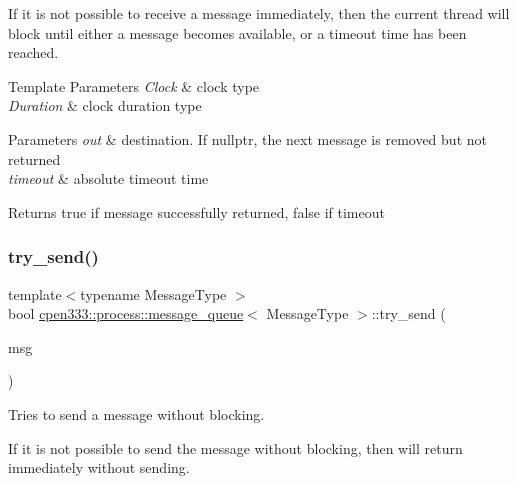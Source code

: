 If it is not possible to receive a message immediately, then the current thread will block until either a message becomes available, or a timeout time has been reached.


\begin{DoxyTemplParams}{Template Parameters}
{\em Clock} & clock type \\
\hline
{\em Duration} & clock duration type \\
\hline
\end{DoxyTemplParams}

\begin{DoxyParams}{Parameters}
{\em out} & destination. If {\ttfamily nullptr}, the next message is removed but not returned \\
\hline
{\em timeout} & absolute timeout time \\
\hline
\end{DoxyParams}
\begin{DoxyReturn}{Returns}
{\ttfamily true} if message successfully returned, {\ttfamily false} if timeout 
\end{DoxyReturn}
\mbox{\label{classcpen333_1_1process_1_1message__queue_ae632a2b200bdac5bc93039b9bcb3d7f5}} 
\subsubsection{\texorpdfstring{try\+\_\+send()}{try\_send()}}
{\footnotesize\ttfamily template$<$typename Message\+Type $>$ \\
bool \hyperlink{classcpen333_1_1process_1_1message__queue}{cpen333\+::process\+::message\+\_\+queue}$<$ Message\+Type $>$\+::try\+\_\+send (\begin{DoxyParamCaption}\item[{const Message\+Type \&}]{msg }\end{DoxyParamCaption})\hspace{0.3cm}{\ttfamily [inline]}}



Tries to send a message without blocking. 

If it is not possible to send the message without blocking, then will return immediately without sending.


